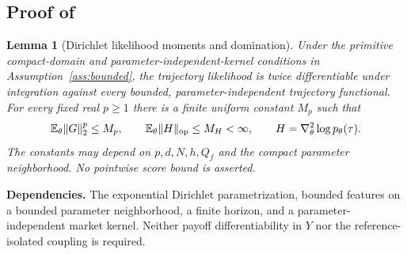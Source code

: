 \documentclass[11pt]{article}
\newtheorem{lemma}[theorem]{Lemma}
\newcommand{\E}{\mathbb E}
\newcommand{\1}{\mathbf 1}
\newcommand{\op}{\mathrm{op}}
\DeclarePairedDelimiter{\norm}{\lVert}{\rVert}
\theoremstyle{definition}
\newcommand{\dependson}[1]{\par\noindent\textbf{Dependencies.} #1\par\smallskip}
\begin{document}
\subsection{Proof of \texorpdfstring{}{the CPT gradient identity}}
\begin{lemma}[Dirichlet likelihood moments and domination]\label{lem:dirichlet-moments}
Under the primitive compact-domain and parameter-independent-kernel conditions in Assumption~\ref{ass:bounded}, the trajectory likelihood is twice differentiable under integration against every bounded, parameter-independent trajectory functional. For every fixed real $p\ge1$ there is a finite uniform constant $M_p$ such that
\[
 \E_\theta\norm{G}_2^p\le M_p,\qquad
 \E_\theta\norm{H}_{\op}\le M_H<\infty,
 \qquad H=\nabla_\theta^2\log p_\theta(\tau).
\]
The constants may depend on $p,d,N,h,Q_f$ and the compact parameter neighborhood. No pointwise score bound is asserted.
\end{lemma}
\dependson{The exponential Dirichlet parametrization, bounded features on a bounded parameter neighborhood, a finite horizon, and a parameter-independent market kernel. Neither payoff differentiability in $Y$ nor the reference-isolated coupling is required.}
\end{document}
